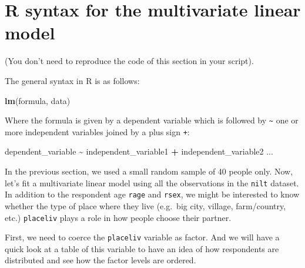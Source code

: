\documentclass[
]{book}
\newenvironment{Shaded}{\begin{snugshade}}{\end{snugshade}}
\newcommand{\AttributeTok}[1]{\textcolor[rgb]{0.13,0.29,0.53}{#1}}
\newcommand{\CommentTok}[1]{\textcolor[rgb]{0.56,0.35,0.01}{\textit{#1}}}
\newcommand{\FunctionTok}[1]{\textcolor[rgb]{0.13,0.29,0.53}{\textbf{#1}}}
\newcommand{\NormalTok}[1]{#1}
\newcommand{\OtherTok}[1]{\textcolor[rgb]{0.56,0.35,0.01}{#1}}
\newcommand{\SpecialCharTok}[1]{\textcolor[rgb]{0.81,0.36,0.00}{\textbf{#1}}}
\begin{document}
\hypertarget{r-syntax-for-the-multivariate-linear-model}{%
\section{R syntax for the multivariate linear model}\label{r-syntax-for-the-multivariate-linear-model}}

(You don't need to reproduce the code of this section in your script).

The general syntax in R is as follows:

\begin{Shaded}
\begin{Highlighting}[]
\FunctionTok{lm}\NormalTok{(formula, data)}
\end{Highlighting}
\end{Shaded}

Where the formula is given by a dependent variable which is followed by \texttt{\textasciitilde{}} one or more independent variables joined by a plus sign \texttt{+}:

\begin{Shaded}
\begin{Highlighting}[]
\NormalTok{dependent\_variable }\SpecialCharTok{\textasciitilde{}}\NormalTok{ independent\_variable1 }\SpecialCharTok{+}\NormalTok{ independent\_variable2 ...}
\end{Highlighting}
\end{Shaded}

In the previous section, we used a small random sample of 40 people only. Now, let's fit a multivariate linear model using all the observations in the \texttt{nilt} dataset. In addition to the respondent age \texttt{rage} and \texttt{rsex}, we might be interested to know whether the type of place where they live (e.g.~big city, village, farm/country, etc.) \texttt{placeliv} plays a role in how people choose their partner.

First, we need to coerce the \texttt{placeliv} variable as factor. And we will have a quick look at a table of this variable to have an idea of how respondents are distributed and see how the factor levels are ordered.

\begin{Shaded}
\end{Shaded}
\end{document}
